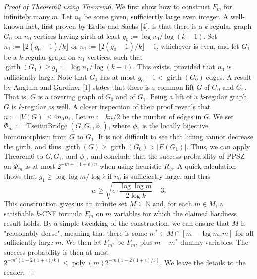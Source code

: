 \documentclass[10pt,a4paper]{article}
\begin{document}
\begin{proof}[Proof of Theorem2 using Theorem6]
We first show how to construct $F_m$ for infinitely many $m$. Let $n_0$ be some given, sufficiently large even integer. A well-known fact, first proven by Erd\H{o}s and Sachs [4], is that there is a $k$-regular graph $G_0$ on $n_0$ vertices having girth at least $g_0:=\log n_0/\log(k-1)$. Set $n_1:=\lfloor2(g_0-1)/k\rfloor$ or $n_1:=\lfloor2(g_0-1)/k\rfloor-1$, whichever is even, and let $G_1$ be a $k$-regular graph on $n_1$ vertices, such that $\operatorname{girth}(G_1)\ge g_1:=\log n_1/\log(k-1)$. This exists, provided that $n_0$ is sufficiently large. Note that $G_1$ has at most $g_0-1<\operatorname{girth}(G_0)$ edges.
A result by Angluin and Gardiner [1] states that there is a common lift $G$ of $G_0$ and $G_1$. That is, $G$ is a covering graph of $G_0$ and of $G_1$. Being a lift of a $k$-regular graph, $G$ is $k$-regular as well. A closer inspection of their proof reveals that $n:=|V(G)|\le4n_0n_1$.
Let $m:=kn/2$ be the number of edges in $G$. We set $\Phi_m:=\operatorname{TseitinBridge}(G,G_1,\phi_1)$, where $\phi_1$ is the locally bijective homomorphism from $G$ to $G_1$.
It is not difficult to see that lifting cannot decrease the girth, and thus $\operatorname{girth}(G)\ge\operatorname{girth}(G_0)>|E(G_1)|$. Thus, we can apply Theorem6 to $G,G_1$, and $\phi_1$, and conclude that the success probability of PPSZ on $\Phi_m$ is at most $2^{-m+(1+\epsilon)n}$ when using heuristic $R_w$. A quick calculation shows that $g_1\ge\log\log m/\log k$ if $n_0$ is sufficiently large, and thus
\[
w\ge\sqrt{\epsilon\cdot\frac{\log\log m}{2\log k}}-3.
\]
This construction gives us an infinite set $M\subseteq\mathbb N$ and, for each $m\in M$, a satisfiable $k$-CNF formula $F_m$ on $m$ variables for which the claimed hardness result holds. By a simple tweaking of the construction, we can ensure that $M$ is "reasonably dense", meaning that there is some $m^*\in M\cap[m-\log m,m]$ for all sufficiently large $m$. We then let $F_{m^*}$ be $F_m$, plus $m-m^*$ dummy variables. The success probability is then at most $2^{-m^*(1-2(1+\epsilon)/k)}\le\operatorname{poly}(m)2^{-m(1-2(1+\epsilon)/k)}$. We leave the details to the reader.
\end{proof}
\end{document}
